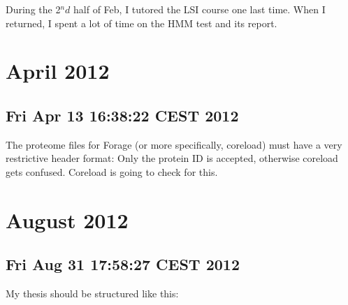 During the 2$^nd$ half of Feb, I tutored the LSI course one last time. When I
returned, I spent a lot of time on the HMM test and its report. 

\section{April 2012}
\subsection*{Fri Apr 13 16:38:22 CEST 2012}

The proteome files for Forage (or more specifically, coreload) must have a very
restrictive header format: Only the protein ID is accepted, otherwise coreload
gets confused. Coreload is going to check for this.

\section{August 2012}
\subsection*{Fri Aug 31 17:58:27 CEST 2012}

My thesis should be structured like this:

